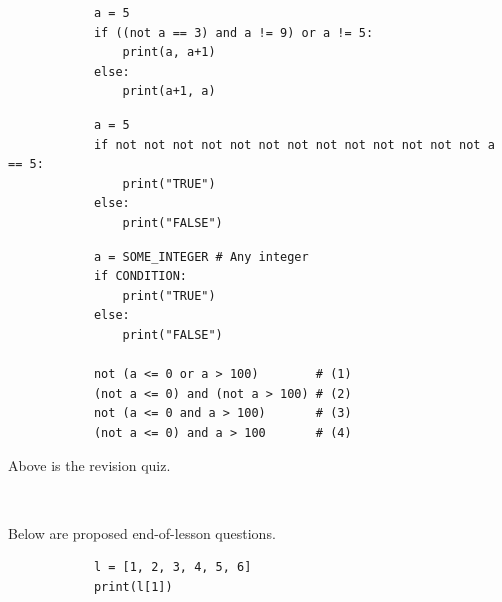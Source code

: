 \documentclass[dvipsnames, svgnames, x11names, handout]{beamer}
\begin{document}
\begin{frame}[fragile]{}
    \begin{center}
        \begin{verbatim}
            a = 5
            if ((not a == 3) and a != 9) or a != 5:
                print(a, a+1)
            else:
                print(a+1, a)
        \end{verbatim}
    \end{center}
\end{frame}

\begin{frame}[fragile]{}
    \begin{center}
        \begin{verbatim}
            a = 5
            if not not not not not not not not not not not not not a == 5:
                print("TRUE")
            else:
                print("FALSE")
        \end{verbatim}
    \end{center}
\end{frame}

\begin{frame}[fragile]{}
    \begin{center}
        \begin{verbatim}
            a = SOME_INTEGER # Any integer
            if CONDITION:
                print("TRUE")
            else:
                print("FALSE")
            
            not (a <= 0 or a > 100)        # (1)
            (not a <= 0) and (not a > 100) # (2)
            not (a <= 0 and a > 100)       # (3)
            (not a <= 0) and a > 100       # (4)
        \end{verbatim}
    \end{center}
\end{frame}

\begin{frame}[fragile]{}
    \begin{center}
        Above is the revision quiz. 
        
        \ 
        
        Below are proposed end-of-lesson questions.
    \end{center}
\end{frame}

\begin{frame}[fragile]{}
    \begin{center}
        \begin{verbatim}
            l = [1, 2, 3, 4, 5, 6]
            print(l[1])
        \end{verbatim}
    \end{center}
\end{frame}
\end{document}
